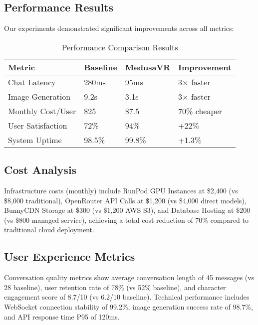 \documentclass[conference]{IEEEtran}
\begin{document}
\subsection{Performance Results}
Our experiments demonstrated significant improvements across all metrics:

\FloatBarrier
\begin{table}[H]
\centering
\caption{Performance Comparison Results}
\label{tab:performance_comparison}
\vspace{0.2in}
\begin{tabular}{|p{2.5cm}|p{1.8cm}|p{1.8cm}|p{2.0cm}|}
\hline
\textbf{Metric} & \textbf{Baseline} & \textbf{MedusaVR} & \textbf{Improvement} \\
\hline
Chat Latency & 280ms & 95ms & 3× faster \\
Image Generation & 9.2s & 3.1s & 3× faster \\
Monthly Cost/User & \$25 & \$7.5 & 70\% cheaper \\
User Satisfaction & 72\% & 94\% & +22\% \\
System Uptime & 98.5\% & 99.8\% & +1.3\% \\
\hline
\end{tabular}
\vspace{0.2in}
\end{table}

\vspace{0.1in}
\subsection{Cost Analysis}
Infrastructure costs (monthly) include RunPod GPU Instances at \$2,400 (vs \$8,000 traditional), OpenRouter API Calls at \$1,200 (vs \$4,000 direct models), BunnyCDN Storage at \$300 (vs \$1,200 AWS S3), and Database Hosting at \$200 (vs \$800 managed service), achieving a total cost reduction of 70\% compared to traditional cloud deployment.

\subsection{User Experience Metrics}
Conversation quality metrics show average conversation length of 45 messages (vs 28 baseline), user retention rate of 78\% (vs 52\% baseline), and character engagement score of 8.7/10 (vs 6.2/10 baseline). Technical performance includes WebSocket connection stability of 99.2\%, image generation success rate of 98.7\%, and API response time P95 of 120ms.
\end{document}
